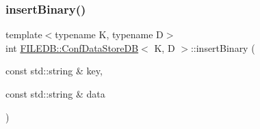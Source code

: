 \subsubsection{\texorpdfstring{insertBinary()}{insertBinary()}\hspace{0.1cm}{\footnotesize\ttfamily [2/2]}}
{\footnotesize\ttfamily template$<$typename K, typename D$>$ \\
int \mbox{\hyperlink{classFILEDB_1_1ConfDataStoreDB}{F\+I\+L\+E\+D\+B\+::\+Conf\+Data\+Store\+DB}}$<$ K, D $>$\+::insert\+Binary (\begin{DoxyParamCaption}\item[{const std\+::string \&}]{key,  }\item[{const std\+::string \&}]{data }\end{DoxyParamCaption})\hspace{0.3cm}{\ttfamily [inline]}}

